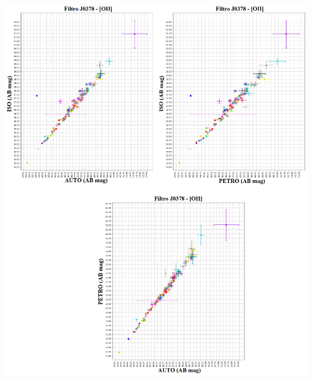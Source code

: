 \begin{anexosenv}
    \begin{figure}[h]
        \centering
        \includegraphics[width=1.0\textwidth]{Imagens/J0378_iso_auto.png}
        \caption[]{}
        \label{fig:J0378_iso_auto} 
    \end{figure}


\end{anexosenv}
